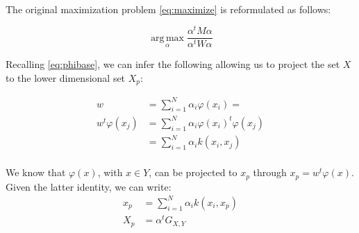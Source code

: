 \paragraph{}
The original maximization problem \ref{eq:maximize} is reformulated as follows:

\begin{equation*}
\label{eq:maximize2}
\boxed{\operatorname*{arg\,max}_\alpha \frac{\alpha^t M \alpha}{\alpha^t W \alpha}}
\end{equation*}

Recalling \ref{eq:phibase}, we can infer the following allowing us to project the set $X$ to the
lower dimensional set $X_p$:

\begin{align*}
  w &= \sum_{i=1}^N \alpha_i \varphi(x_i) = \\
  w^t \varphi(x_j) &= \sum_{i = 1}^N \alpha_i \varphi(x_i)^t \varphi(x_j)\\
                   &= \sum_{i = 1}^N \alpha_i k(x_i, x_j) \\
\end{align*}

We know that $\varphi(x)$, with $x \in Y$, can be projected to $x_p$ through $x_p = w^t \varphi(x)$.
Given the latter identity, we can write:
\begin{align*}
x_p &= \sum_{i = 1}^N \alpha_i k(x_i, x_p) \\
X_p &= \alpha^t G_{X,Y} \\
\end{align*}

